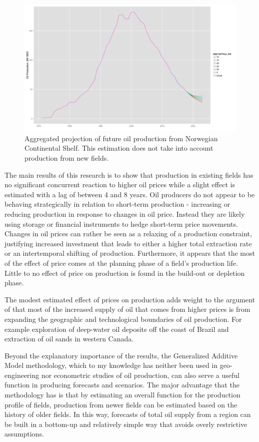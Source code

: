 \documentclass[12pt]{article}
\begin{document}
\begin{figure}
	\includegraphics[width=1\textwidth]{figures/tot_forecast_print.png}
	\caption{Aggregated projection of future oil production from Norwegian Continental Shelf.  This estimation does not take into account production from new fields.}
	\label{tot_forecast}
\end{figure}


The main results of this research is to show that production in existing fields has no significant concurrent reaction to higher oil prices while a slight effect is estimated  with a lag of between 4 and 8 years.  Oil producers do not appear to be behaving strategically in relation to short-term production - increasing or reducing production in response to changes in oil price.  Instead they are likely using storage or financial instruments to hedge short-term price movements. Changes in oil prices can rather be seen as a relaxing of a production constraint, justifying increased investment that leads to either a higher total extraction rate or an intertemporal shifting of production. Furthermore, it appears that the most of the effect of price comes at the planning phase of a field's production life.  Little to no effect of price on production is found in the build-out or depletion phase.

The modest estimated effect of prices on production adds weight to the argument of \citet{hamilton_oil_2012} that most of the increased supply of oil that comes from higher prices is from expanding the geographic and technological boundaries of oil production.  For example exploration of deep-water oil deposits off the coast of Brazil and extraction of oil sands in western Canada.  

Beyond the explanatory importance of the results, the Generalized Additive Model methodology, which to my knowledge has neither been used in geo-engineering nor econometric studies of oil production, can also serve a useful function in producing forecasts and scenarios.  The major advantage that the methodology has is that by estimating an overall function for the production profile of fields, production from newer fields can be estimated based on the history of older fields.  In this way, forecasts of total oil supply from a region can be built in a bottom-up and relatively simple way that avoids overly restrictive assumptions. 
\end{document}
